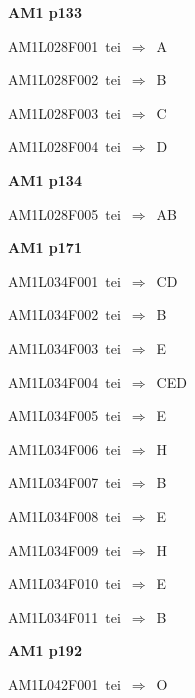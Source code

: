 \par\vfill\eject
{\bf\hfill AM1 p133\hfill\hbox{}}\par\bigskip
{\sixrm AM1L028F001\ {\sixit tei}\ }$\Rightarrow$\ A\par\smallskip
{\sixrm AM1L028F002\ {\sixit tei}\ }$\Rightarrow$\ B\par\smallskip
{\sixrm AM1L028F003\ {\sixit tei}\ }$\Rightarrow$\ C\par\smallskip
{\sixrm AM1L028F004\ {\sixit tei}\ }$\Rightarrow$\ D\par\smallskip

\par\vfill\eject
{\bf\hfill AM1 p134\hfill\hbox{}}\par\bigskip
{\sixrm AM1L028F005\ {\sixit tei}\ }$\Rightarrow$\ AB\par\smallskip

\par\vfill\eject
{\bf\hfill AM1 p171\hfill\hbox{}}\par\bigskip
{\sixrm AM1L034F001\ {\sixit tei}\ }$\Rightarrow$\ CD\par\smallskip
{\sixrm AM1L034F002\ {\sixit tei}\ }$\Rightarrow$\ B\par\smallskip
{\sixrm AM1L034F003\ {\sixit tei}\ }$\Rightarrow$\ E\par\smallskip
{\sixrm AM1L034F004\ {\sixit tei}\ }$\Rightarrow$\ CED\par\smallskip
{\sixrm AM1L034F005\ {\sixit tei}\ }$\Rightarrow$\ E\par\smallskip
{\sixrm AM1L034F006\ {\sixit tei}\ }$\Rightarrow$\ H\par\smallskip
{\sixrm AM1L034F007\ {\sixit tei}\ }$\Rightarrow$\ B\par\smallskip
{\sixrm AM1L034F008\ {\sixit tei}\ }$\Rightarrow$\ E\par\smallskip
{\sixrm AM1L034F009\ {\sixit tei}\ }$\Rightarrow$\ H\par\smallskip
{\sixrm AM1L034F010\ {\sixit tei}\ }$\Rightarrow$\ E\par\smallskip
{\sixrm AM1L034F011\ {\sixit tei}\ }$\Rightarrow$\ B\par\smallskip

\par\vfill\eject
{\bf\hfill AM1 p192\hfill\hbox{}}\par\bigskip
{\sixrm AM1L042F001\ {\sixit tei}\ }$\Rightarrow$\ O\par\smallskip

